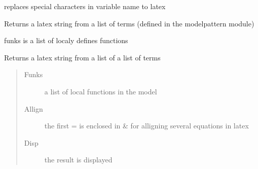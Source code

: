 \documentclass[letterpaper,10pt,english]{sphinxmanual}
\begin{document}
\begin{fulllineitems}
\label{\detokenize{jupyter/modeljupyter:modeljupyter.vtol}}
\pysigstartsignatures
{}
\pysigstopsignatures
\sphinxAtStartPar
replaces special characters in variable name to latex

\end{fulllineitems}


\begin{fulllineitems}
\label{\detokenize{jupyter/modeljupyter:modeljupyter.an_expression_to_latex}}
\pysigstartsignatures
{}
\pysigstopsignatures
\sphinxAtStartPar
Returns a latex string from a list of terms (defined in the modelpattern module)

\sphinxAtStartPar
funks is a list of localy defines functions

\end{fulllineitems}


\begin{fulllineitems}
\label{\detokenize{jupyter/modeljupyter:modeljupyter.expressions_to_latex}}
\pysigstartsignatures
{}
\pysigstopsignatures
\sphinxAtStartPar
Returns a latex string from a list of a list of terms
\begin{quote}\begin{description}
\item[{Funks}] \leavevmode
\sphinxAtStartPar
a list of local functions in the model

\item[{Allign}] \leavevmode
\sphinxAtStartPar
the first = is enclosed in \& for alligning several equations in latex

\item[{Disp}] \leavevmode
\sphinxAtStartPar
the result is displayed

\end{description}\end{quote}

\end{fulllineitems}
\end{document}
